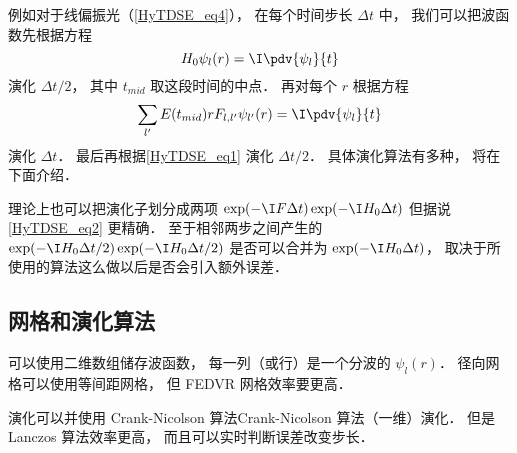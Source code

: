 例如对于线偏振光（\autoref{HyTDSE_eq4}）， 在每个时间步长 $\Delta t$ 中， 我们可以把波函数先根据方程
\begin{equation}\label{HyTDSE_eq1}
H_0 \psi_{l}(r) = \I \pdv{\psi_{l}}{t}
\end{equation}
演化 $\Delta t/2$， 其中 $t_{mid}$ 取这段时间的中点． 再对每个 $r$ 根据方程
\begin{equation}\label{HyTDSE_eq9}
\sum_{l'} E(t_{mid})rF_{l, l'} \psi_{l'}(r) = \I \pdv{\psi_{l}}{t}
\end{equation}
演化 $\Delta t$． 最后再根据\autoref{HyTDSE_eq1} 演化 $\Delta t/2$． 具体演化算法有多种， 将在下面介绍．

理论上也可以把演化子划分成两项 $\exp(-\I F \Delta t)\exp(-\I H_0 {\Delta t})$ 但据说\autoref{HyTDSE_eq2} 更精确． 至于相邻两步之间产生的 $\exp(-\I H_0 {\Delta t}/{2})\exp(-\I H_0 {\Delta t}/{2})$ 是否可以合并为 $\exp(-\I H_0 {\Delta t})$， 取决于所使用的算法这么做以后是否会引入额外误差．

\subsection{网格和演化算法}

可以使用二维数组储存波函数， 每一列（或行）是一个分波的 $\psi_l(r)$． 径向网格可以使用等间距网格， 但 FEDVR 网格效率要更高．

演化可以并使用 Crank-Nicolson 算法Crank-Nicolson 算法（一维）演化． 但是 Lanczos 算法效率更高， 而且可以实时判断误差改变步长．
